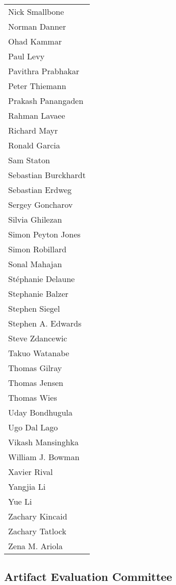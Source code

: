 \begin{tabular}[t]{@{}p{\namewidth}}
Nick Smallbone \\
Norman Danner \\
Ohad Kammar \\
Paul Levy \\
Pavithra Prabhakar \\
Peter Thiemann \\
Prakash Panangaden \\
Rahman Lavaee \\
Richard Mayr \\
Ronald Garcia \\
Sam Staton \\
Sebastian Burckhardt \\
Sebastian Erdweg \\
Sergey Goncharov \\
Silvia Ghilezan \\
Simon Peyton Jones \\
Simon Robillard \\
Sonal Mahajan \\
St\'{e}phanie Delaune \\
Stephanie Balzer \\
Stephen  Siegel \\
Stephen A. Edwards \\
Steve Zdancewic \\
Takuo Watanabe \\
Thomas Gilray \\
Thomas Jensen \\
Thomas Wies \\
Uday Bondhugula \\
Ugo Dal Lago \\
Vikash Mansinghka \\
William J. Bowman \\
Xavier Rival \\
Yangjia Li \\
Yue Li \\
Zachary Kincaid \\
Zachary Tatlock \\
Zena M. Ariola
\end{tabular}

\subsection*{\sffamily Artifact Evaluation Committee}

